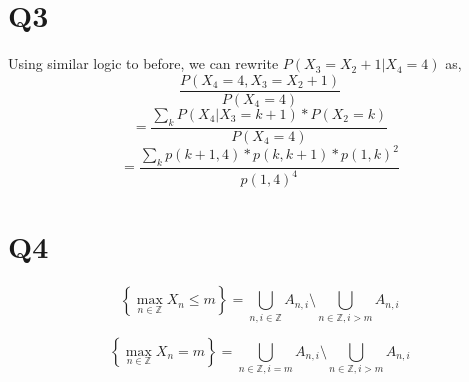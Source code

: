 \documentclass{article}
\begin{document}
\section*{Q3}
Using similar logic to before, we can rewrite $P(X_3 = X_2 + 1 | X_4 = 4)$ as,
\[
\frac{P(X_4 = 4 , X_3 = X_2 + 1)}{P(X_4 = 4)}
\]
\[
= \frac{\sum_k P(X_4 | X_3 = k +1)*P(X_2 = k)}{P(X_4 = 4)}
\]
\[
=\frac{\sum_k p(k+1,4) * p(k,k+1)*p(1,k)^2}{p(1,4)^4}
\]

\section*{Q4}
\[
\left\{\max_{n \in \mathbb{Z}} X_n \leq m \right\}  = \bigcup_{n,i \in \mathbb{Z}} A_{n,i} \setminus \bigcup_{n \in \mathbb{Z} , i > m} A_{n,i} 
\]

\[
\left\{\max_{n \in \mathbb{Z}} X_n = m \right\}  = \bigcup_{n \in \mathbb{Z} , i = m} A_{n,i} \setminus \bigcup_{n \in \mathbb{Z} , i > m} A_{n,i} 
\]
\end{document}
